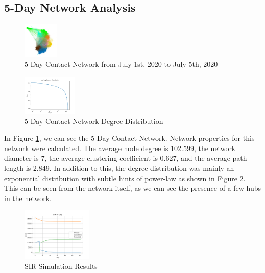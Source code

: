 \documentclass[times, 10pt,twocolumn]{article}
\begin{document}
\subsection{5-Day Network Analysis}

\begin{figure}
    \centering
    \includegraphics[width=0.15\textwidth]{imgs/5_day_network.png}
    \caption{5-Day Contact Network from July 1st, 2020 to July 5th, 2020}
    \label{fig:my_label}
\end{figure}


\begin{figure}
    \centering
    \includegraphics[width=0.23\textwidth]{imgs/5_day_log_log_degree_distribution.png}
    \caption{5-Day Contact Network Degree Distribution}
    \label{fig:deg_dist}
\end{figure}

In Figure \ref{fig:my_label}, we can see the 5-Day Contact Network. Network properties for this network were calculated. The average node degree is 102.599, the network diameter is 7, the average clustering coefficient is 0.627, and the average path length is 2.849. In addition to this, the degree distribution was mainly an exponential distribution with subtle hints of power-law as shown in Figure \ref{fig:deg_dist}. This can be seen from the network itself, as we can see the presence of a few hubs in the network.



\begin{figure}[h]
    \centering
    \includegraphics[width=0.30\textwidth]{imgs/complete_simulation.png}
    \caption{SIR Simulation Results}
    \label{fig:simulation_results}
\end{figure}
\end{document}
